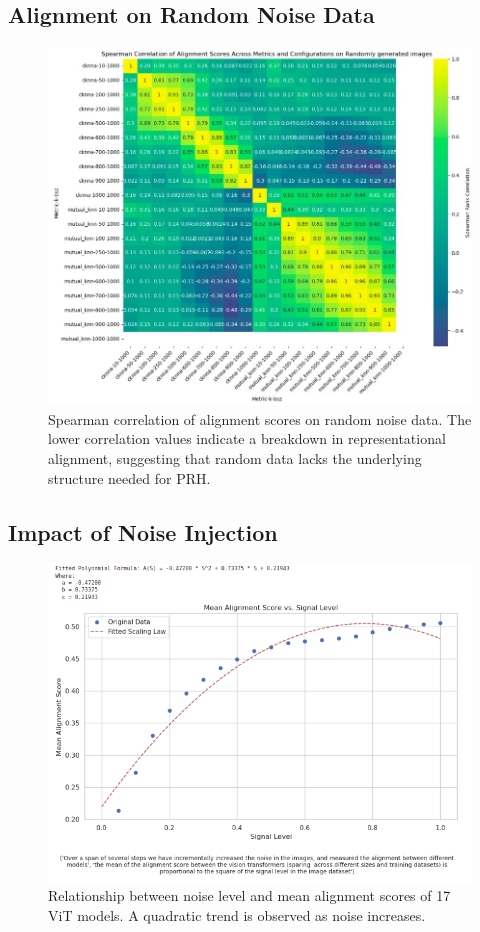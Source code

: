 \documentclass[10pt,a4paper]{article}
\begin{document}
\subsection{Alignment on Random Noise Data}
\begin{figure}[H]
    \centering
    \includegraphics[width=\textwidth]{prh_correlation_random.jpg}
    \caption{Spearman correlation of alignment scores on random noise data. The lower correlation values indicate a breakdown in representational alignment, suggesting that random data lacks the underlying structure needed for PRH.}
    \label{fig:prh_correlation_random}
\end{figure}



\subsection{Impact of Noise Injection}
\begin{figure}[H]
    \centering
    \includegraphics[width=\textwidth]{alignment_vs_signal_level.png}
    \caption{Relationship between noise level and mean alignment scores of 17 ViT models. A quadratic trend is observed as noise increases.}
    \label{fig:alignment_vs_signal_level}
\end{figure}
\end{document}
